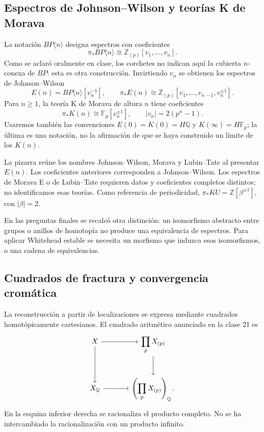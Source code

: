 \subsection{Espectros de Johnson--Wilson y teorías K de Morava}
La notación $BP\langle n\rangle$ designa espectros con coeficientes
\[
\pi_*BP\langle n\rangle\cong\mathbb Z_{(p)}[v_1,\ldots,v_n].
\]
Como se aclaró oralmente en clase, los corchetes no indican aquí la cubierta $n$-conexa de $BP$: esta es otra construcción. Invirtiendo $v_n$ se obtienen los espectros de Johnson--Wilson
\[
E(n)=BP\langle n\rangle[v_n^{-1}],
\qquad
\pi_*E(n)\cong\mathbb Z_{(p)}[v_1,\ldots,v_{n-1},v_n^{\pm1}].
\]
Para $n\geq1$, la teoría K de Morava de altura $n$ tiene coeficientes
\[
\pi_*K(n)\cong\mathbb F_p[v_n^{\pm1}],
\qquad |v_n|=2(p^n-1).
\]
Usaremos también las convenciones $E(0)=K(0)=H\mathbb Q$ y $K(\infty)=H\mathbb F_p$; la última es una notación, no la afirmación de que se haya construido un límite de los $K(n)$.

La pizarra reúne los nombres Johnson--Wilson, Morava y Lubin--Tate al presentar $E(n)$. Los coeficientes anteriores corresponden a Johnson--Wilson. Los espectros de Morava E o de Lubin--Tate requieren datos y coeficientes completos distintos; no identificamos esas teorías. Como referencia de periodicidad, $\pi_*KU=\mathbb Z[\beta^{\pm1}]$, con $|\beta|=2$.

En las preguntas finales se recalcó otra distinción: un isomorfismo abstracto entre grupos o anillos de homotopía no produce una equivalencia de espectros. Para aplicar Whitehead estable se necesita un morfismo que induzca esos isomorfismos, o una cadena de equivalencias.

\subsection{Cuadrados de fractura y convergencia cromática}
La reconstrucción a partir de localizaciones se expresa mediante cuadrados homotópicamente cartesianos. El cuadrado aritmético anunciado en la clase 21 es
\[
\begin{tikzcd}[column sep=large,row sep=large]
X\arrow[r]\arrow[d]&\displaystyle\prod_pX_{(p)}\arrow[d]\\
X_{\mathbb Q}\arrow[r]&\displaystyle\left(\prod_pX_{(p)}\right)_{\mathbb Q}.
\end{tikzcd}
\]
En la esquina inferior derecha se racionaliza el producto completo. No se ha intercambiado la racionalización con un producto infinito.

